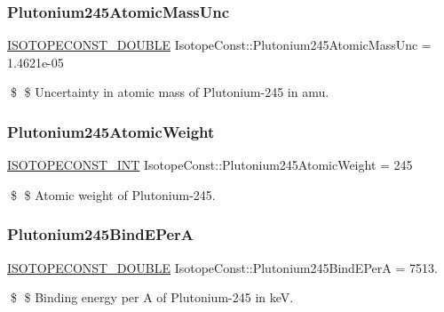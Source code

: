 \subsubsection{\texorpdfstring{Plutonium245\+Atomic\+Mass\+Unc}{Plutonium245AtomicMassUnc}}
{\footnotesize\ttfamily \mbox{\hyperlink{group___isotope_const-_macros_ga8f45a7272ce02c0b4c65c44636ed719a}{I\+S\+O\+T\+O\+P\+E\+C\+O\+N\+S\+T\+\_\+\+D\+O\+U\+B\+LE}} Isotope\+Const\+::\+Plutonium245\+Atomic\+Mass\+Unc = 1.\+4621e-\/05}

\$ \$ Uncertainty in atomic mass of Plutonium-\/245 in amu. \mbox{\label{group___isotope_const-_plutonium-_pu245_ga2ea7ce2f4d7ccd89e51861e09ff95be2}} 
\subsubsection{\texorpdfstring{Plutonium245\+Atomic\+Weight}{Plutonium245AtomicWeight}}
{\footnotesize\ttfamily \mbox{\hyperlink{group___isotope_const-_macros_ga5f18360b3e99483a35c32d789e62621c}{I\+S\+O\+T\+O\+P\+E\+C\+O\+N\+S\+T\+\_\+\+I\+NT}} Isotope\+Const\+::\+Plutonium245\+Atomic\+Weight = 245}

\$ \$ Atomic weight of Plutonium-\/245. \mbox{\label{group___isotope_const-_plutonium-_pu245_ga6add66a2ce1cb745e4eb9250d84426ef}} 
\subsubsection{\texorpdfstring{Plutonium245\+Bind\+E\+PerA}{Plutonium245BindEPerA}}
{\footnotesize\ttfamily \mbox{\hyperlink{group___isotope_const-_macros_ga8f45a7272ce02c0b4c65c44636ed719a}{I\+S\+O\+T\+O\+P\+E\+C\+O\+N\+S\+T\+\_\+\+D\+O\+U\+B\+LE}} Isotope\+Const\+::\+Plutonium245\+Bind\+E\+PerA = 7513.}

\$ \$ Binding energy per A of Plutonium-\/245 in keV. \mbox{\label{group___isotope_const-_plutonium-_pu245_ga3bca8ad4bc8fe53ea2de1188cef56844}} 
